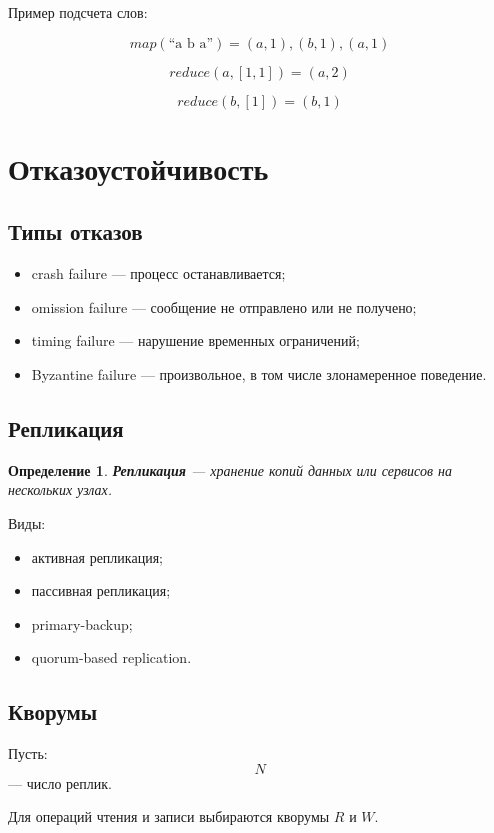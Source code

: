 \documentclass[12pt,a4paper]{article}
\newtheorem{definition}{Определение}
\begin{document}
Пример подсчета слов:

\[
map(\text{``a b a''}) = (a,1),(b,1),(a,1)
\]

\[
reduce(a,[1,1]) = (a,2)
\]

\[
reduce(b,[1]) = (b,1)
\]

\section{Отказоустойчивость}

\subsection{Типы отказов}

\begin{itemize}
    \item crash failure --- процесс останавливается;
    \item omission failure --- сообщение не отправлено или не получено;
    \item timing failure --- нарушение временных ограничений;
    \item Byzantine failure --- произвольное, в том числе злонамеренное поведение.
\end{itemize}

\subsection{Репликация}

\begin{definition}
\textbf{Репликация} --- хранение копий данных или сервисов на нескольких узлах.
\end{definition}

Виды:
\begin{itemize}
    \item активная репликация;
    \item пассивная репликация;
    \item primary-backup;
    \item quorum-based replication.
\end{itemize}

\subsection{Кворумы}

Пусть:
\[
N
\]
--- число реплик.

Для операций чтения и записи выбираются кворумы $R$ и $W$.
\end{document}

